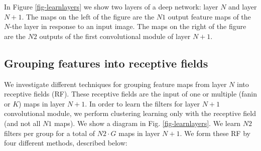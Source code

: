 \documentclass{article} %
\begin{document}
In Figure \ref{fig-learnlayers} we show two layers of a deep network: layer $N$ and layer $N+1$.
The maps on the left of the figure are the $N1$ output feature maps of the $N$-the layer in response to an input image.
The maps on the right of the figure are the $N2$ outputs of the first convolutional module of layer $N+1$. 

\subsection{Grouping features into receptive fields}

We investigate different techniques for grouping feature maps from layer $N$ into receptive fields (RF).
These receptive fields are the input of one or multiple (fanin or $K$) maps in layer $N+1$. In order to learn the filters for layer $N+1$ convolutional module, we perform clustering learning only with the receptive field (and not all $N1$ maps). We show a diagram in Fig. \ref{fig-learnlayers}. We learn $N2$ filters per group for a total of $N2 \cdot G$ maps in layer $N+1$.
We form these RF by four different methods, described below:
\end{document}
